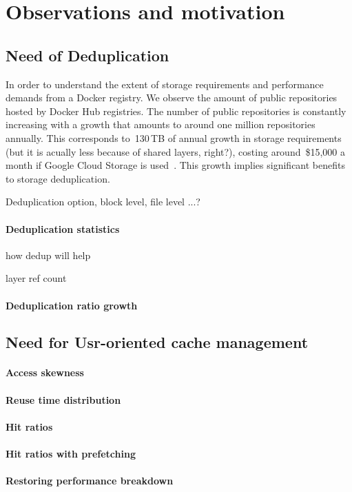 \section{Observations and motivation} %
\label{sec:background}

\subsection{Need of Deduplication}

In order to understand the extent of storage requirements and performance demands from a Docker registry. 
We observe the amount of public repositories hosted by Docker Hub registries. 
The number of public repositories is constantly increasing with a growth that amounts 
to around one million repositories annually. 
This corresponds to~130\,TB of annual growth in storage requirements (but it is acually less because of shared layers, right?), 
costing around~\$15,000 a month if Google Cloud Storage is used~\cite{GoogleCloudStoragePricing}.
This growth implies significant benefits to storage deduplication. 

Deduplication option, block level, file level ...?



\paragraph{Deduplication statistics} %

how dedup will help


layer ref count 

\paragraph{Deduplication ratio growth} %

\subsection{Need for Usr-oriented cache management}

\paragraph{Access skewness}

\paragraph{Reuse time distribution}

\paragraph{Hit ratios}

\paragraph{Hit ratios with prefetching}


\paragraph{Restoring performance breakdown}